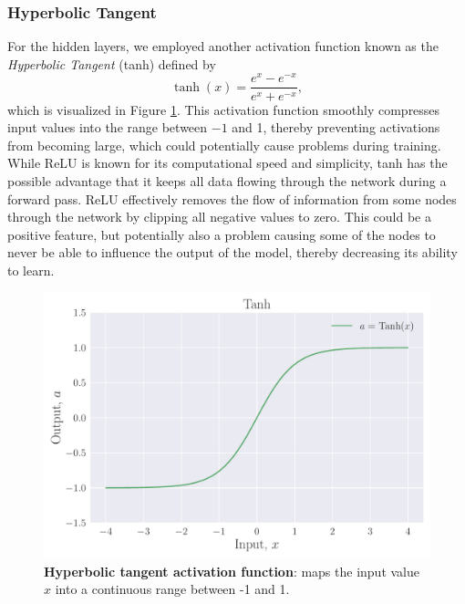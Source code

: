 \documentclass[a4paper, UKenglish, 11pt]{uiomaster}
\begin{document}
\subsubsection{Hyperbolic Tangent}
For the hidden layers, we employed another activation function known as the \emph{Hyperbolic Tangent} (tanh) defined by
\begin{equation}
  \tanh(x) = \frac{e^x - e^{-x}}{e^x + e^{-x}},
\end{equation}
which is visualized in Figure \ref{fig:Tanh}.
This activation function smoothly compresses input values into the range between \(-1\) and 1, thereby preventing activations from becoming large, which could potentially cause problems during training.
While ReLU is known for its computational speed and simplicity, tanh has the possible advantage that it keeps all data flowing through the network during a forward pass. ReLU effectively removes the flow of information from some nodes through the network by clipping all negative values to zero. This could be a positive feature, but potentially also a problem causing some of the nodes to never be able to influence the output of the model, thereby decreasing its ability to learn.
\begin{figure}[ht]
    \centering
    \includegraphics[width=\linewidth]{figures/Tanh.pdf}
    \caption{\textbf{Hyperbolic tangent activation function}: maps the input value $x$ into a continuous range between -1 and 1.}
    \label{fig:Tanh}
\end{figure}

\end{document}
